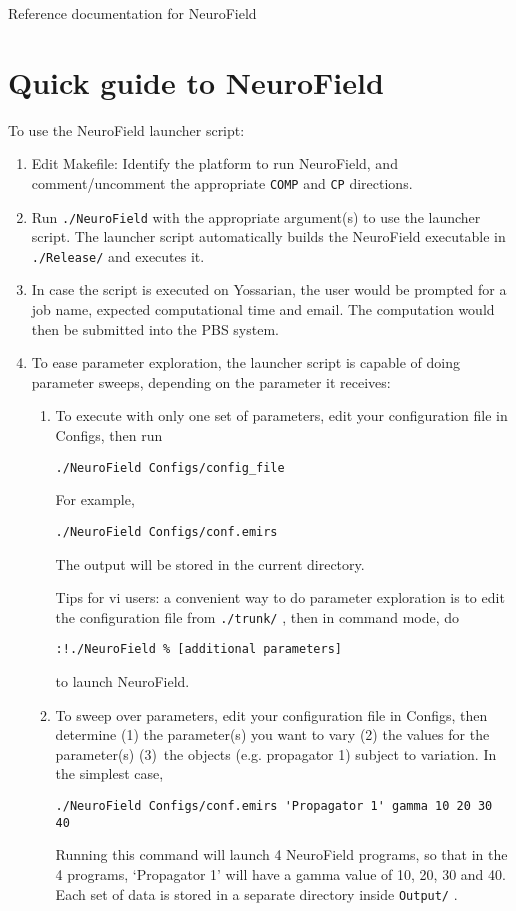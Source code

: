 \documentclass[12pt,a4paper]{article}
\newcommand{\type}[1]{ {\small\small\tt #1} }
\begin{document}
 

{\center \Huge{Reference documentation for NeuroField}}

\section{Quick guide to NeuroField}

To use the NeuroField launcher script:
\begin{enumerate}

\item Edit Makefile: Identify the platform to run NeuroField, and comment/uncomment the appropriate \type{COMP} and \type{CP} directions.

\item Run \type{./NeuroField} with the appropriate argument(s) to use the launcher script. The launcher script automatically builds the NeuroField executable in \type{./Release/} and executes it.

\item In case the script is executed on Yossarian, the user would be prompted for a job name, expected computational time and email. The computation would then be submitted into the PBS system.

\item To ease parameter exploration, the launcher script is capable of doing parameter sweeps, depending on the parameter it receives:

\begin{enumerate}

\item To execute with only one set of parameters, edit your configuration file in Configs, then run
\begin{lstlisting}
./NeuroField Configs/config_file
\end{lstlisting}
For example,
\begin{lstlisting}
./NeuroField Configs/conf.emirs
\end{lstlisting}
The output will be stored in the current directory.

Tips for vi users: a convenient way to do parameter exploration is to edit the configuration file from \type{./trunk/}, then in command mode, do
\begin{lstlisting}
:!./NeuroField % [additional parameters]
\end{lstlisting}
to launch NeuroField.

\item To sweep over parameters, edit your configuration file in Configs, then determine (1) the parameter(s) you want to vary (2) the values for the parameter(s) (3)~the objects (e.g. propagator 1) subject to variation. In the simplest case,
\begin{lstlisting}
./NeuroField Configs/conf.emirs 'Propagator 1' gamma 10 20 30 40
\end{lstlisting}
Running this command will launch 4 NeuroField programs, so that in the 4 programs, `Propagator 1' will have a gamma value of 10, 20, 30 and 40. Each set of data is stored in a separate directory inside \type{Output/}.


\end{enumerate}
\end{enumerate}
\end{document}

